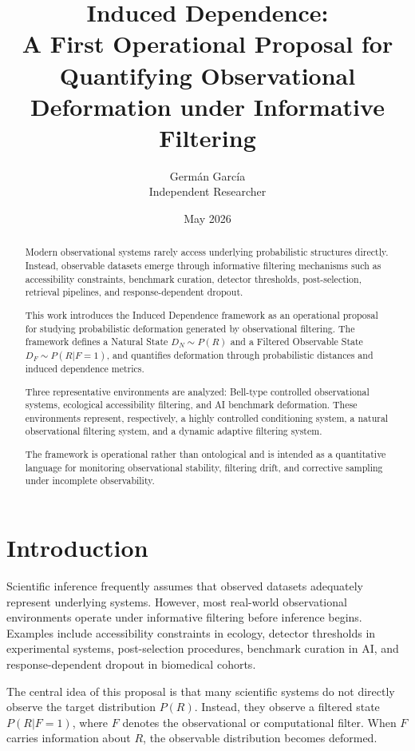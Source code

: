 \documentclass[11pt]{article}
\title{Induced Dependence:\\
A First Operational Proposal for Quantifying Observational Deformation under Informative Filtering}
\author{Germán García\\
Independent Researcher}
\date{May 2026}
\begin{document}
\maketitle

\begin{abstract}
Modern observational systems rarely access underlying probabilistic structures directly. Instead, observable datasets emerge through informative filtering mechanisms such as accessibility constraints, benchmark curation, detector thresholds, post-selection, retrieval pipelines, and response-dependent dropout.

This work introduces the Induced Dependence framework as an operational proposal for studying probabilistic deformation generated by observational filtering. The framework defines a Natural State $D_N \sim P(R)$ and a Filtered Observable State $D_F \sim P(R|F=1)$, and quantifies deformation through probabilistic distances and induced dependence metrics.

Three representative environments are analyzed: Bell-type controlled observational systems, ecological accessibility filtering, and AI benchmark deformation. These environments represent, respectively, a highly controlled conditioning system, a natural observational filtering system, and a dynamic adaptive filtering system.

The framework is operational rather than ontological and is intended as a quantitative language for monitoring observational stability, filtering drift, and corrective sampling under incomplete observability.
\end{abstract}

\section{Introduction}

Scientific inference frequently assumes that observed datasets adequately represent underlying systems. However, most real-world observational environments operate under informative filtering before inference begins. Examples include accessibility constraints in ecology, detector thresholds in experimental systems, post-selection procedures, benchmark curation in AI, and response-dependent dropout in biomedical cohorts.

The central idea of this proposal is that many scientific systems do not directly observe the target distribution $P(R)$. Instead, they observe a filtered state $P(R|F=1)$, where $F$ denotes the observational or computational filter. When $F$ carries information about $R$, the observable distribution becomes deformed.
\end{document}
